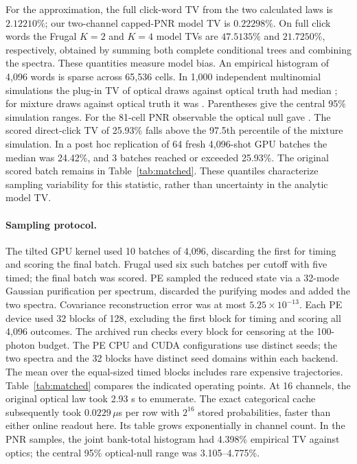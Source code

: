 \documentclass[11pt]{article}
\begin{document}
For the approximation, the full click-word TV from the two calculated laws is $2.12210\%$; our two-channel capped-PNR model TV is $0.22298\%$. On full click words the Frugal $K=2$ and $K=4$ model TVs are $47.5135\%$ and $21.7250\%$, respectively, obtained by summing both complete conditional trees and combining the spectra. These quantities measure model bias. An empirical histogram of 4,096 words is sparse across 65,536 cells. In 1,000 independent multinomial simulations the plug-in TV of optical draws against optical truth had median \OpticalNull; for mixture draws against optical truth it was \TiltNull. Parentheses give the central 95\% simulation ranges. For the 81-cell PNR observable the optical null gave \PairNull. The scored direct-click TV of 25.93\% falls above the 97.5th percentile of the mixture simulation. In a post hoc replication of 64 fresh 4,096-shot GPU batches the median was 24.42\%, and 3 batches reached or exceeded 25.93\%. The original scored batch remains in Table~\ref{tab:matched}. These quantiles characterize sampling variability for this statistic, rather than uncertainty in the analytic model TV.

\paragraph{Sampling protocol.}
The tilted GPU kernel used 10 batches of 4,096, discarding the first for timing and scoring the final batch. Frugal used six such batches per cutoff with five timed; the final batch was scored. PE sampled the reduced state via a 32-mode Gaussian purification per spectrum, discarded the purifying modes and added the two spectra. Covariance reconstruction error was at most $5.25\times10^{-13}$. Each PE device used 32 blocks of 128, excluding the first block for timing and scoring all 4,096 outcomes. The archived run checks every block for censoring at the 100-photon budget. The PE CPU and CUDA configurations use distinct seeds; the two spectra and the 32 blocks have distinct seed domains within each backend. The mean over the equal-sized timed blocks includes rare expensive trajectories. Table~\ref{tab:matched} compares the indicated operating points. At 16 channels, the original optical law took 2.93 s to enumerate. The exact categorical cache subsequently took $0.0229\,\mu$s per row with $2^{16}$ stored probabilities, faster than either online readout here. Its table grows exponentially in channel count. In the PNR samples, the joint bank-total histogram had 4.398\% empirical TV against optics; the central 95\% optical-null range was 3.105--4.775\%.
\end{document}
